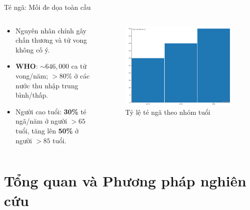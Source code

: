 \begin{frame}{Té ngã: Mối đe dọa toàn cầu}
    \begin{columns}[T]
        \begin{column}{0.48\textwidth}
            \begin{itemize}
                \item Nguyên nhân chính gây chấn thương và tử vong không cố ý.
                \item \textbf{WHO}: $\sim646,000$ ca tử vong/năm; $>80\%$ ở các nước thu nhập trung bình/thấp.
                \item Người cao tuổi: \textbf{30\%} té ngã/năm ở người $>65$ tuổi, tăng lên \textbf{50\%} ở người $>85$ tuổi.
            \end{itemize}
        \end{column}
        \begin{column}{0.48\textwidth}
            \begin{figure}
                \centering
                \includegraphics[width=\textwidth]{images/fall_status_who.png}
                \caption{Tỷ lệ té ngã theo nhóm tuổi}
            \end{figure}
        \end{column}
    \end{columns}
\end{frame}

\section{Tổng quan và Phương pháp nghiên cứu}

